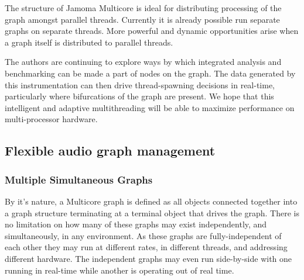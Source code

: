 \documentclass[twoside,a4paper]{article}
\begin{document}
The structure of Jamoma Multicore is ideal for distributing processing of the graph amongst parallel threads.  
Currently it is already possible run separate graphs on separate threads.  
More powerful and dynamic opportunities arise when a graph itself is distributed to parallel threads.  

The authors are continuing to explore ways by which integrated analysis and benchmarking can be made a part of nodes on the graph.  
The data generated by this instrumentation can then drive thread-spawning decisions in real-time, particularly where bifurcations of the graph are present.  
We hope that this intelligent and adaptive multithreading will be able to maximize performance on multi-processor hardware.

%   



\subsection{Flexible audio graph management} %

\subsubsection{Multiple Simultaneous Graphs} %


By it's nature, a Multicore graph is defined as all objects connected together into a graph structure terminating at a terminal object that drives the graph.  
There is no limitation on how many of these graphs may exist independently, and simultaneously, in any environment.  
As these graphs are fully-independent of each other they may run at different rates, in different threads, and addressing different hardware.  The independent graphs may even run side-by-side with one running in real-time while another is operating out of real time.

\end{document}
